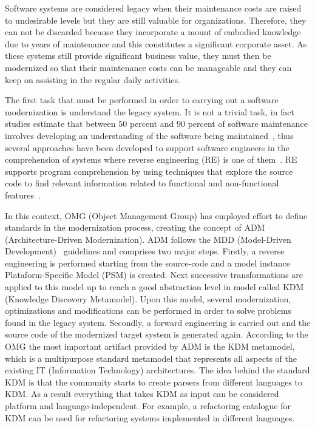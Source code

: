 Software systems are considered legacy when their maintenance costs are raised to undesirable levels but they are still valuable for organizations. Therefore, they can not be discarded because they incorporate a mount of embodied knowledge due to years of maintenance and this constitutes a significant corporate asset. As these systems still provide significant business value, they must then be modernized so that their maintenance costs can be manageable and they can keep on assisting in the regular daily activities. 

The first task that must be performed in order to carrying out a software modernization is understand the legacy system. It is not a trivial task, in fact studies estimate that between $50$ percent and $90$ percent of software maintenance involves developing an understanding of the software being maintained~\cite{Tilley95perspectiveson}, thus several approaches have been developed to support software engineers in the comprehension of systems where reverse engineering (RE) is one of them~\cite{Canfora2011}. RE supports program comprehension by using techniques that explore the source code to find relevant information related to functional and non-functional features~\cite{chikofskyTax}.

In this context, OMG (Object Management Group) has employed effort to define standards in the modernization process, creating the concept of ADM (Architecture-Driven Modernization). ADM follows the MDD (Model-Driven Development)~\cite{5440163} guidelines and comprises two major steps. Firstly, a reverse engineering is performed starting from the source-code and a model instance Plataform-Specific Model (PSM) is created. Next successive transformations are applied to this model up to reach a good abstraction level in model called KDM (Knowledge Discovery Metamodel). Upon this model, several modernization, optimizations and modifications can be performed in order to solve problems found in the legacy system. Secondly, a forward engineering is carried out and the source code of the modernized target system is generated again. According to the OMG the most important artifact provided by ADM is the KDM metamodel, which is a multipurpose standard metamodel that represents all aspects of the existing IT (Information  Technology) architectures. The idea behind the standard KDM is that the community starts to create parsers from different languages to KDM. As a result everything that takes KDM as input can be considered platform and language-independent. For example, a refactoring catalogue for KDM can be used for refactoring systems implemented in different languages. 

